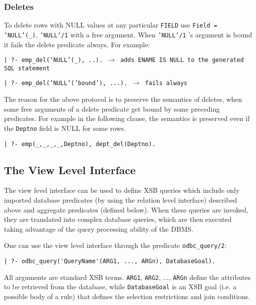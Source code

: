 \subsubsection{Deletes}


To delete rows with NULL values at any particular {\tt FIELD} use {\tt Field = 'NULL'(\_)}, {\tt 'NULL'/1} with a free argument.  When {\tt 'NULL'/1} 's argument
is bound it fails the delete predicate always.  For example:

\begin{center}
{\tt | ?- emp\_del('NULL'(\_), ..).  $\rightarrow$ adds ENAME IS NULL to the generated SQL statement}
\end{center}
\begin{center}

{\tt | ?- emp\_del('NULL'('bound'), ...).  $\rightarrow$ fails always}

\end{center}

The reason for the above protocol is to preserve the semantics of deletes, 
when some free arguments of a delete predicate get bound by some preceding
predicates.  For example in the following clause, the semantics is preserved 
even if the {\tt Deptno} field is NULL for some rows.

\begin{center}
{\tt | ?- emp(\_,\_,\_,\_,Deptno), dept\_del(Deptno).}
\end{center}

\subsection{The View Level Interface}

The view level interface can be used to define XSB queries which
include only imported database predicates (by using the relation level
interface) described above and aggregate predicates (defined below).
When these queries are invoked, they are translated into complex
database queries, which are then executed taking advantage of the
query processing ability of the DBMS.

One can use the view level interface through the predicate {\tt odbc\_query/2}:  
\begin{verbatim}
| ?- odbc_query('QueryName'(ARG1, ..., ARGn), DatabaseGoal).
\end{verbatim}
All arguments are standard XSB terms.  {\tt ARG1}, {\tt ARG2}, ...,
{\tt ARGn} define the attributes to be retrieved from the database,
while {\tt DatabaseGoal} is an XSB goal (i.e. a possible body of a
rule) that defines the selection restrictions and join conditions.

